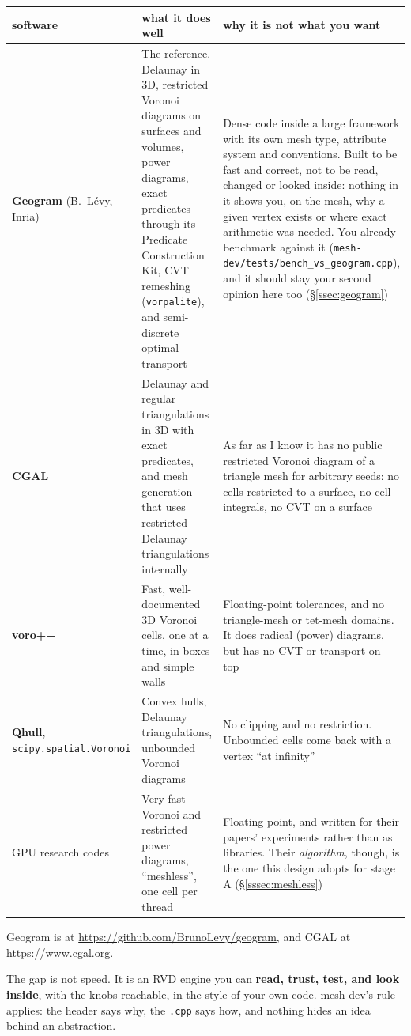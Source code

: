 \documentclass[11pt,a4paper]{article}
\newcommand{\code}[1]{\texttt{#1}}          %
\newcommand{\secref}[1]{\S\ref{#1}}
\begin{document}
{\small
\begin{xltabular}{\linewidth}{@{}P{2.3cm} L L@{}}
\toprule
software & what it does well & why it is not what you want \\
\midrule
\endhead
\textbf{Geogram} (B.~Lévy, Inria)
  & The reference. Delaunay in 3D, restricted Voronoi diagrams on surfaces and volumes, power
    diagrams, exact predicates through its Predicate Construction Kit, CVT remeshing
    (\code{vorpalite}), and semi-discrete optimal transport
  & Dense code inside a large framework with its own mesh type, attribute system and
    conventions. Built to be fast and correct, not to be read, changed or looked inside:
    nothing in it shows you, on the mesh, why a given vertex exists or where exact arithmetic
    was needed. You already benchmark against it (\code{mesh-dev/\allowbreak tests/\allowbreak bench\_vs\_geogram.cpp}),
    and it should stay your second opinion here too (\secref{ssec:geogram}) \\
\textbf{CGAL}
  & Delaunay and regular triangulations in 3D with exact predicates, and mesh generation that
    uses restricted Delaunay triangulations internally
  & As far as I know it has no public restricted Voronoi diagram of a triangle mesh for
    arbitrary seeds: no cells restricted to a surface, no cell integrals, no CVT on a
    surface \\
\textbf{voro++} \citep{rycroft2009}
  & Fast, well-documented 3D Voronoi cells, one at a time, in boxes and simple walls
  & Floating-point tolerances, and no triangle-mesh or tet-mesh domains. It does radical
    (power) diagrams, but has no CVT or transport on top \\
\textbf{Qhull}, \code{scipy.\allowbreak spatial.\allowbreak Voronoi}
  & Convex hulls, Delaunay triangulations, unbounded Voronoi diagrams
  & No clipping and no restriction. Unbounded cells come back with a vertex ``at infinity'' \\
GPU research codes \citep{ray2018,basselin2021}
  & Very fast Voronoi and restricted power diagrams, ``meshless'', one cell per thread
  & Floating point, and written for their papers' experiments rather than as libraries. Their
    \emph{algorithm}, though, is the one this design adopts for stage A
    (\secref{sssec:meshless}) \\
\bottomrule
\end{xltabular}}
Geogram is at \url{https://github.com/BrunoLevy/geogram}, and CGAL at \url{https://www.cgal.org}.

The gap is not speed. It is an RVD engine you can \textbf{read, trust, test, and look inside},
with the knobs reachable, in the style of your own code. mesh-dev's rule applies: the header
says why, the \code{.cpp} says how, and nothing hides an idea behind an abstraction.
\end{document}
